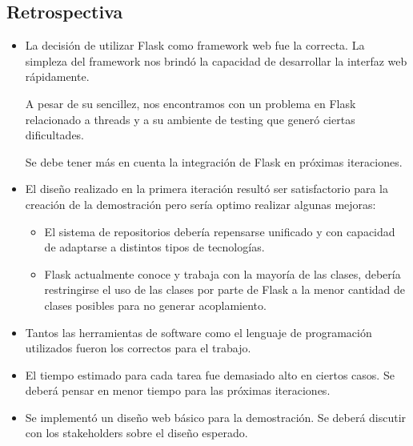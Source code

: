 \documentclass[a4paper, 10pt, twoside]{article}
\begin{document}
\subsection{Retrospectiva}
\begin{itemize}
  \item La decisión de utilizar Flask como framework web fue la correcta. La simpleza del framework nos brindó la capacidad de desarrollar la interfaz web rápidamente. 

  A pesar de su sencillez, nos encontramos con un problema en Flask relacionado a threads y a su ambiente de testing que generó ciertas dificultades. 

  Se debe tener más en cuenta la integración de Flask en próximas iteraciones.
  \item El diseño realizado en la primera iteración resultó ser satisfactorio para la creación de la demostración pero sería optimo realizar algunas mejoras:
  \begin{itemize}
    \item El sistema de repositorios debería repensarse unificado y con capacidad de adaptarse a distintos tipos de tecnologías. 

    \item Flask actualmente conoce y trabaja con la mayoría de las clases, debería restringirse el uso de las clases por parte de Flask a la menor cantidad de clases posibles para no generar acoplamiento.
  \end{itemize}

  \item Tantos las herramientas de software como el lenguaje de programación utilizados fueron los correctos para el trabajo.

  \item El tiempo estimado para cada tarea fue demasiado alto en ciertos casos. Se deberá pensar en menor tiempo para las próximas iteraciones.

  \item Se implementó un diseño web básico para la demostración. Se deberá discutir con los stakeholders sobre el diseño esperado.

\end{itemize}





\end{document}

